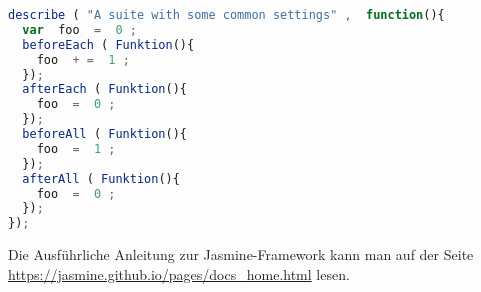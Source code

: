 
\begin{lstlisting}[language=JavaScript,basicstyle=\scriptsize]
describe ( "A suite with some common settings" ,  function(){ 
  var  foo  =  0 ;
  beforeEach ( Funktion(){ 
    foo  + =  1 ; 
  });  
  afterEach ( Funktion(){ 
    foo  =  0 ; 
  });  
  beforeAll ( Funktion(){ 
    foo  =  1 ; 
  });  
  afterAll ( Funktion(){ 
    foo  =  0 ; 
  });  
});
\end{lstlisting}

Die Ausführliche Anleitung zur Jasmine-Framework kann man auf der Seite \url{https://jasmine.github.io/pages/docs_home.html} lesen. 
